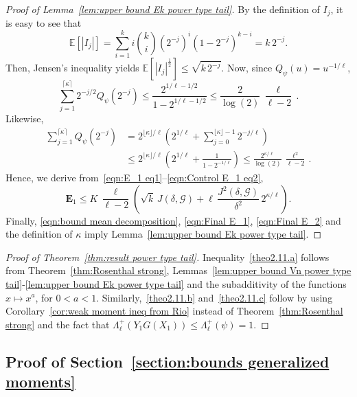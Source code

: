 \documentclass[AHL,Unicode,longabstracts,published]{cedram}
\newcommand{\bE}{\mathbb{E}}
\newcommand{\bfE}{\mathbf{E}}
\newcommand{\caG}{\mathscr{G}}
\begin{document}
\begin{proof}[Proof of Lemma~\ref{lem:upper bound Ek power type tail}]
By the definition of $I_j$, it is easy to see that
\[
\bE\left[|I_j|\right]=\sum_{i=1}^k i \binom{k}{i} (2^{-j})^i (1-2^{-j})^{k-i} = k\,2^{-j}.
\]
Then, Jensen's inequality yields $\bE[|I_j|^{\frac{1}{2}}]\leq \sqrt{k\,2^{-j}}$. Now, since $Q_\psi(u)=u^{-1/\ell}$,
\begin{equation}\label{eqn:Control E_1 eq1}
\sum_{j=1}^{\lceil\kappa\rceil} 2^{-j/2}Q_\psi(2^{-j}) \leq \frac{2^{1/\ell-1/2}}{1-2^{1/\ell-1/2}}\leq \frac{2}{\log(2)}\,\frac{\ell}{\ell-2}\,.
\end{equation}
Likewise,
\begin{equation}\label{eqn:Control E_1 eq2}
\begin{aligned}
\sum_{j=1}^{\lceil\kappa\rceil} Q_\psi(2^{-j}) &= 2^{\lfloor\kappa\rfloor /\ell}\left(2^{1/\ell}+\sum_{j=0}^{\lfloor\kappa\rfloor-1}2^{-j/\ell}\right)\\
&\leq 2^{\lfloor\kappa\rfloor /\ell}\left(2^{1/\ell}+\frac{1}{1-2^{-1/\ell}}\right)
\leq \frac{2^{\kappa/\ell}}{\log(2)}\,\frac{\ell^2}{\ell-2}\,.
\end{aligned}
\end{equation}
Hence, we derive from~\eqref{eqn:E_1 eq1}--\eqref{eqn:Control E_1 eq2},
\begin{equation}\label{eqn:Final E_1}
\bfE_1\leq K\,\frac{\ell}{\ell-2}\left(\sqrt{k}\,J(\delta,\caG) + \ell\,\frac{J^2(\delta,\caG)}{\delta^2}\,2^{\kappa/\ell}\right).
\end{equation}
Finally, \eqref{eqn:bound mean decomposition}, \eqref{eqn:Final E_1}, \eqref{eqn:Final E_2} and the definition of $\kappa$ imply Lemma~\ref{lem:upper bound Ek power type tail}.
\end{proof}

\begin{proof}[Proof of Theorem~\ref{thm:result power type tail}]
Inequality~\eqref{theo2.11.a} follows from Theorem~\ref{thm:Rosenthal strong}, Lemmas~\ref{lem:upper bound Vn power type tail}-\ref{lem:upper bound Ek power type tail} and the subadditivity of the functions $x\mapsto x^a$, for $0<a<1$. Similarly,~\eqref{theo2.11.b} and~\eqref{theo2.11.c} follow by using Corollary~\ref{cor:weak moment ineq from Rio} instead of Theorem~\ref{thm:Rosenthal strong} and the fact that $\Lambda_\ell^+(Y_1G(X_1))\leq\Lambda_\ell^+(\psi)=1$.
\end{proof}

\subsection{Proof of Section~\ref{section:bounds generalized moments}}
\end{document}
